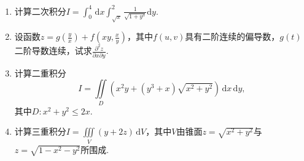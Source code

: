 \documentclass[../Main.tex]{subfiles}
\begin{document}
\begin{enumerate}
    \item 计算二次积分$I=\int_{0}^{4}\,\mathrm{d}x\int_{\sqrt{x}}^{2}\frac{1}{\sqrt{1+y^{3}}}
              \mathrm{d}y$.
          \vspace{12em}

    \item 设函数$z=g\left(\frac{y}{x}\right)+f\left(xy,\frac{x}{y}\right)$，其中$f
              (u,v)$具有二阶连续的偏导数，$g(t)$二阶导数连续，试求$\frac{\partial^{2} z}{\partial
                  x \partial y}$.
          \vspace{10em}

    \item 计算二重积分
          \[
              I=\iint\limits_{D}\left(x^{2} y+\left(y^{3}+x\right)\sqrt{x^{2}+y^{2}}\right
              )\,\mathrm{d}x\,\mathrm{d}y,
          \]
          其中$D:x^{2}+y^{2}\leq 2x$.
          \vspace{10em}

    \item 计算三重积分$I=\iiint\limits_{V}(y+2z)\,\mathrm{d}V$，其中$V$由锥面$z=\sqrt{x^{2}+y^{2}}$与$z
              =\sqrt{1-x^{2}-y^{2}}$所围成.
          \vspace{10em}
\end{enumerate}
\end{document}
